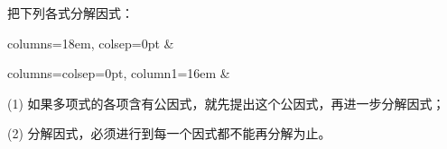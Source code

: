 \liti 把下列各式分解因式：
\begin{xiaoxiaotis}

    \begin{tblr}{columns={18em, colsep=0pt}}
         & 
    \end{tblr}

\resetxxt
\jie \begin{tblr}[t]{columns={colsep=0pt}, column{1}={16em}}
     & 
\end{tblr}

\end{xiaoxiaotis}


\zhuyi (1) 如果多项式的各项含有公因式，就先提出这个公因式，再进一步分解因式；

(2) 分解因式，必须进行到每一个因式都不能再分解为止。


